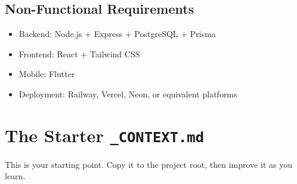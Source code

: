 \subsection{Non-Functional Requirements}
\begin{itemize}
  \item Backend: Node.js + Express + PostgreSQL + Prisma
  \item Frontend: React + Tailwind CSS
  \item Mobile: Flutter
  \item Deployment: Railway, Vercel, Neon, or equivalent platforms
\end{itemize}

\section{The Starter \texttt{\_CONTEXT.md}}

This is your starting point. Copy it to the project root, then improve it as you learn.

